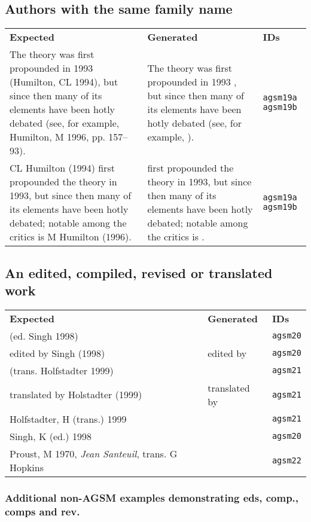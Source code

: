 \documentclass[a4paper,landscape,12pt]{article}
\newlength\q
\newlength\qr
\newenvironment{citetable}
  {\noindent\begin{longtable}{p{\q} p{\q} p{\qr}}\textbf{Expected} & \textbf{Generated} & \textbf{IDs}\\}
  {\end{longtable}}
\newcommand{\majorissue}[1]{\textcolor{red}{#1}}
\begin{document}
\subsection{Authors with the same family name}

\begin{citetable}
	The theory was first propounded in 1993 (Humilton, CL 1994), but since then many of its elements have been hotly debated (see, for example, Humilton, M 1996, pp. 157--93). & The theory was first propounded in 1993 \parencite{agsm19a}, but since then many of its elements have been hotly debated (see, for example, \cite[pp.~157--93]{agsm19b}). & \texttt{agsm19a} \texttt{agsm19b} \\
	CL Humilton (1994) first propounded the theory in 1993, but since then many of its elements have been hotly debated; notable among the critics is M Humilton (1996). & \textcite{agsm19a} first propounded the theory in 1993, but since then many of its elements have been hotly debated; notable among the critics is \textcite{agsm19b}. & \texttt{agsm19a} \texttt{agsm19b} \\
\end{citetable}

\subsection{An edited, compiled, revised or translated work}

\begin{citetable}
	(ed. Singh 1998) & \majorissue{\parencite{agsm20}} & \texttt{agsm20} \\
	edited by Singh (1998) & edited by \textcite{agsm20} & \texttt{agsm20} \\
	(trans. Holfstadter 1999) & \majorissue{\parencite{agsm21}} & \texttt{agsm21} \\
	translated by Holstadter (1999) & translated by \textcite{agsm21} & \texttt{agsm21} \\
	Holfstadter, H (trans.) 1999 & \fullcite{agsm21} & \texttt{agsm21} \\
	Singh, K (ed.) 1998 & \fullcite{agsm20} & \texttt{agsm20} \\
	Proust, M 1970, \textit{Jean Santeuil}, trans. G Hopkins & \fullcite{agsm22} & \texttt{agsm22} \\
\end{citetable}

\subsubsection{Additional non-AGSM examples demonstrating eds, comp., comps and rev.}
\end{document}
